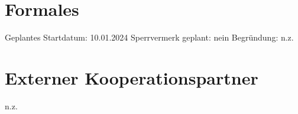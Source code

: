 \documentclass{article}
\begin{document}

\section{Formales}
Geplantes Startdatum: 10.01.2024
\linebreak
Sperrvermerk geplant: nein
\linebreak
Begründung: n.z.

\section{Externer Kooperationspartner}
n.z.

\printbibliography
\end{document}
